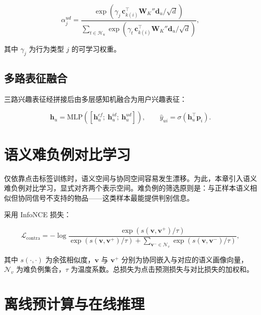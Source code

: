 \begin{equation}
  \alpha_{j}^{ud} = \frac{\exp\left(\gamma_j\,\mathbf{c}_{k(i)}^{\top}\mathbf{W}_K''\mathbf{d}_u / \sqrt{d}\right)}
  {\sum_{t\in\mathcal{H}_u}\exp\left(\gamma_t\,\mathbf{c}_{k(i)}^{\top}\mathbf{W}_K''\mathbf{d}_u / \sqrt{d}\right)},
  \label{eq:user-attention}
\end{equation}

其中 $\gamma_j$ 为行为类型 $j$ 的可学习权重。

\subsection{多路表征融合}
\label{subsec:fusion}

三路兴趣表征经拼接后由多层感知机融合为用户兴趣表征：

\begin{equation}
  \mathbf{h}_u = \mathrm{MLP}\left(\left[\mathbf{h}_u^{cf};\ \mathbf{h}_u^{id};\ \mathbf{h}_u^{ud}\right]\right),
  \qquad
  \hat{y}_{ui} = \sigma\left(\mathbf{h}_u^{\top}\mathbf{p}_i\right).
  \label{eq:fusion}
\end{equation}

\section{语义难负例对比学习}
\label{sec:hard-negative}

仅依靠点击标签训练时，语义空间与协同空间容易发生漂移。为此，本章引入语义难负例对比学习，显式对齐两个表示空间。难负例的筛选原则是：与正样本语义相似但协同信号不支持的物品——这类样本最能提供判别信息。

采用 InfoNCE 损失：

\begin{equation}
  \mathcal{L}_{\mathrm{contra}} = -\log
  \frac{\exp\left(s(\mathbf{v},\mathbf{v}^{+})/\tau\right)}
  {\exp\left(s(\mathbf{v},\mathbf{v}^{+})/\tau\right) + \sum_{\mathbf{v}^{-}\in\mathcal{N}_{v}}\exp\left(s(\mathbf{v},\mathbf{v}^{-})/\tau\right)},
  \label{eq:infonce}
\end{equation}

其中 $s(\cdot,\cdot)$ 为余弦相似度，$\mathbf{v}$ 与 $\mathbf{v}^{+}$ 分别为协同嵌入与对应的语义画像向量，$\mathcal{N}_v$ 为难负例集合，$\tau$ 为温度系数。总损失为点击预测损失与对比损失的加权和。


\section{离线预计算与在线推理}
\label{sec:serving}


